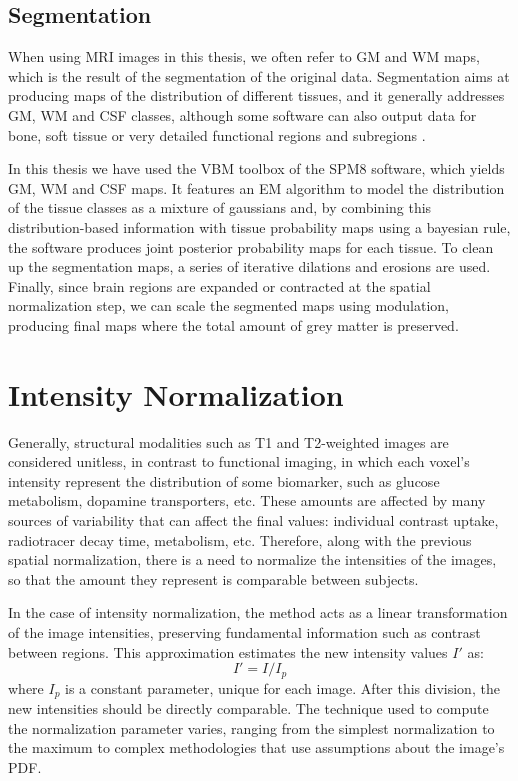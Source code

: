 \subsection{Segmentation}
When using \ac{MRI} images in this thesis, we often refer to \acf{GM} and \acf{WM} maps, which is the result of the segmentation of the original data. Segmentation aims at producing maps of the distribution of different tissues, and it generally addresses \ac{GM}, \ac{WM} and \ac{CSF} classes, although some software can also output data for bone, soft tissue or very detailed functional regions and subregions \cite{Fischl2002}. 

In this thesis we have used the \ac{VBM} toolbox of the \ac{SPM8} software, which yields \ac{GM}, \ac{WM} and \ac{CSF} maps. It features an \ac{EM} algorithm to model the distribution of the tissue classes as a mixture of gaussians and, by combining this distribution-based information with tissue probability maps using a bayesian rule, the software produces joint posterior probability maps for each tissue. To clean up the segmentation maps, a series of iterative dilations and erosions are used. Finally, since brain regions are expanded or contracted at the spatial normalization step, we can scale the segmented maps using modulation, producing final maps where the total amount of grey matter is preserved. 

\section{Intensity Normalization}\label{sec:intensityPrep}
Generally, structural modalities such as T1 and T2-weighted images are considered unitless, in contrast to functional imaging, in which each voxel's intensity represent the distribution of some biomarker, such as glucose metabolism, dopamine transporters, etc. These amounts are affected by many sources of variability that can affect the final values: individual contrast uptake, radiotracer decay time, metabolism, etc. Therefore, along with the previous spatial normalization, there is a need to normalize the intensities of the images, so that the amount they represent is comparable between subjects.

In the case of intensity normalization, the method acts as a linear transformation of the image intensities, preserving fundamental information such as contrast between regions. This approximation estimates the new intensity values $I'$ as: 
\begin{equation}
	I' = I/I_p 
\end{equation}
where $I_p$ is a constant parameter, unique for each image. After this division, the new intensities should be directly comparable. The technique used to compute the normalization parameter varies, ranging from the simplest normalization to the maximum \cite{Salas-Gonzalez2009,Martinez-Murcia20129676} to complex methodologies that use assumptions about the image's \ac{PDF}. 

